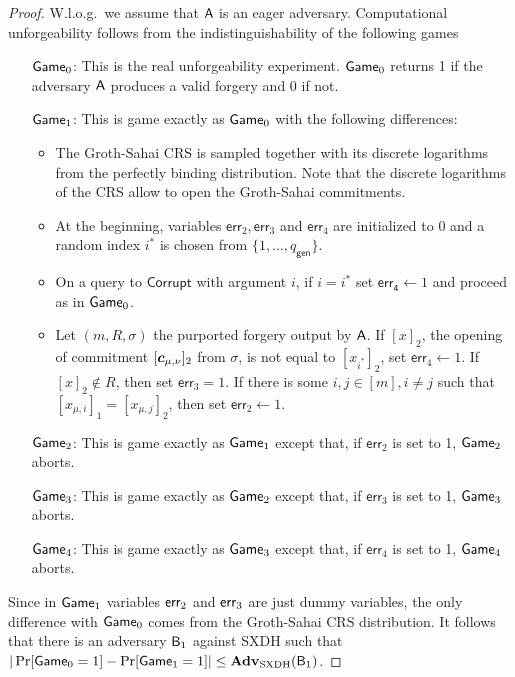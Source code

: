 \begin{proof}
W.l.o.g.~we assume that $\mathsf{A}$ is an eager adversary. Computational unforgeability follows from the indistinguishability of the following games
\begin{itemize}
\item[$\mathsf{Game}_0$:] This is the real unforgeability experiment. $\mathsf{Game}_0$ returns 1 if the adversary $\mathsf{A}$ produces a valid forgery and 0 if not.
\item[$\mathsf{Game}_1$:] This is game exactly as $\mathsf{Game}_0$ with the following differences: 
    \begin{itemize}
    \item The Groth-Sahai CRS is sampled together with its discrete logarithms from the perfectly binding distribution. Note that the discrete logarithms of the CRS allow to open the Groth-Sahai commitments.
    \item At the beginning, variables $\mathsf{err}_2,\mathsf{err}_3$ and $\mathsf{err}_4$ are initialized to $0$ and a random index $i^*$ is chosen from $\{1,\ldots, q_\mathsf{gen}\}$.
    \item On a query to $\mathsf{Corrupt}$ with argument $i$, if $i=i^*$ set $\mathsf{err_4}\gets 1$ and proceed as in $\mathsf{Game}_0$.
    \item Let $(m,R,\sigma)$ the purported forgery output by $\mathsf{A}$. If $[x]_2$, the opening of commitment $[{\boldsymbol{c}}_{\mu,\nu}]_2$ from $\sigma$, is not equal to $[x_{i^*}]_2$,  set $\mathsf{err}_4\gets 1$. If $[x]_2\notin R$, then set $\mathsf{err}_3=1$. If there is some $i,j\in[m],i\neq j$ such that $[x_{\mu,i}]_1=[x_{\mu,j}]_2$, then set $\mathsf{err}_2\gets 1$.
    \end{itemize}
\item[$\mathsf{Game}_2$:] This is game exactly as $\mathsf{Game}_1$ except that, if $\mathsf{err}_2$ is set to 1, $\mathsf{Game}_2$ aborts.
\item[$\mathsf{Game}_3$:] This is game exactly as $\mathsf{Game}_2$ except that, if $\mathsf{err}_3$ is set to 1, $\mathsf{Game}_3$ aborts.
\item[$\mathsf{Game}_4$:] This is game exactly as $\mathsf{Game}_3$ except that, if $\mathsf{err}_4$ is set to 1, $\mathsf{Game}_4$ aborts. 
\end{itemize}
Since in $\mathsf{Game}_1$ variables $\mathsf{err}_2$ and $\mathsf{err}_3$ are just dummy variables, the only difference with $\mathsf{Game}_0$ comes from the Groth-Sahai CRS distribution. It follows that there is an adversary $\mathsf{B}_{1}$ against SXDH such that $|\Pr[\mathsf{Game}_0=1]-\Pr[\mathsf{Game}_1=1]|\leq \mathbf{Adv}_{\mathrm{SXDH}}(\mathsf{B}_{1})$.


\end{proof}
